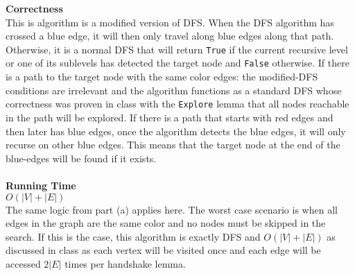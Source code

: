 \documentclass{article}
\begin{document}
\begin{enumerate}
        \textbf{Correctness} \\
        This is algorithm is a modified version of DFS. When the DFS algorithm has crossed a blue edge, it will then only travel along blue edges
        along that path. Otherwise, it is a normal DFS that will return \texttt{True} if the current recursive level or one of its sublevels has detected the target node
        and \texttt{False} otherwise. If there is a path to the target node with the same color edges: the modified-DFS conditions are irrelevant and the algorithm functions as a standard DFS whose correctness
        was proven in class with the \texttt{Explore} lemma that all nodes reachable in the path will be explored. If there is a path that starts with red edges and then later has blue edges,
        once the algorithm detects the blue edges, it will only recurse on other blue edges. This means that the target node at the end of the blue-edges will be found if it exists.\\\\
        \textbf{Running Time} \\
        $O(|V| + |E|)$ \\
        The same logic from part (a) applies here. The worst case scenario is when all edges in the graph are the same color and no nodes must be skipped in the search. 
        If this is the case, this algorithm is exactly DFS and $O(|V| + |E|)$ as discussed in class as each vertex will be visited once
        and each edge will be accessed $2|E|$ times per handshake lemma. 
\end{enumerate}

\newpage
\end{document}
